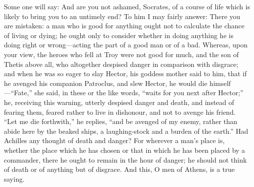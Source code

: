 \documentclass[11pt,letter]{article}
\begin{document}
\par  Some one will say: And are you not ashamed, Socrates, of a course of life which is likely to bring you to an untimely end? To him I may fairly answer: There you are mistaken: a man who is good for anything ought not to calculate the chance of living or dying; he ought only to consider whether in doing anything he is doing right or wrong—acting the part of a good man or of a bad. Whereas, upon your view, the heroes who fell at Troy were not good for much, and the son of Thetis above all, who altogether despised danger in comparison with disgrace; and when he was so eager to slay Hector, his goddess mother said to him, that if he avenged his companion Patroclus, and slew Hector, he would die himself—“Fate,” she said, in these or the like words, “waits for you next after Hector;” he, receiving this warning, utterly despised danger and death, and instead of fearing them, feared rather to live in dishonour, and not to avenge his friend. “Let me die forthwith,” he replies, “and be avenged of my enemy, rather than abide here by the beaked ships, a laughing-stock and a burden of the earth.” Had Achilles any thought of death and danger? For wherever a man’s place is, whether the place which he has chosen or that in which he has been placed by a commander, there he ought to remain in the hour of danger; he should not think of death or of anything but of disgrace. And this, O men of Athens, is a true saying.
\end{document}
